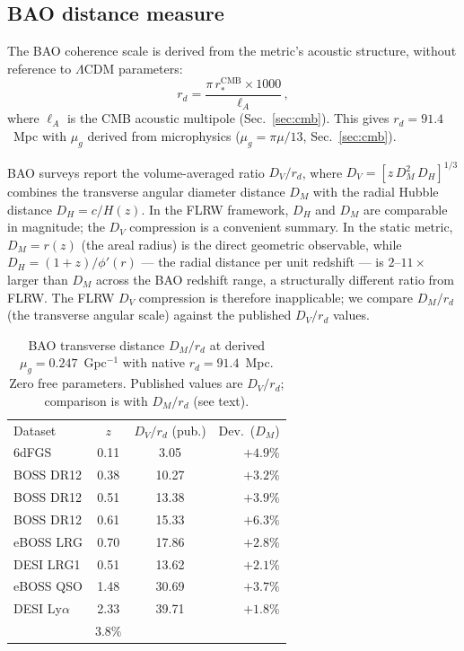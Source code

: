 \documentclass[aps,prd,twocolumn,superscriptaddress,nofootinbib,longbibliography]{revtex4-2}
\newcommand{\rstar}{r_{*}}
\newcommand{\mug}{\mu_g}
\begin{document}
\subsection{BAO distance measure}

The BAO coherence scale is derived from the metric's acoustic
structure, without reference to $\Lambda$CDM parameters:
\begin{equation}\label{eq:rd}
  r_d = \frac{\pi\,\rstar^{\mathrm{CMB}} \times 1000}{\ell_A}\,,
\end{equation}
where $\ell_A$ is the CMB acoustic multipole (Sec.~\ref{sec:cmb}).
This gives $r_d = 91.4$~Mpc with $\mug$ derived from microphysics
($\mug = \pi\mu/13$, Sec.~\ref{sec:cmb}).

BAO surveys report the volume-averaged ratio $D_V/r_d$, where
$D_V = [z\,D_M^2\,D_H]^{1/3}$ combines the transverse angular
diameter distance $D_M$ with the radial Hubble distance
$D_H = c/H(z)$.  In the FLRW framework, $D_H$ and $D_M$ are
comparable in magnitude; the $D_V$ compression is a convenient
summary.  In the static metric, $D_M = r(z)$ (the areal radius) is
the direct geometric observable, while
$D_H = (1+z)/\phi'(r)$ --- the radial distance per unit redshift ---
is $2$--$11\times$ larger than $D_M$ across the BAO redshift range,
a structurally different ratio from FLRW.  The FLRW $D_V$ compression
is therefore inapplicable; we compare $D_M/r_d$ (the transverse
angular scale) against the published $D_V/r_d$ values.

\begin{table}[t]
\caption{\label{tab:bao}%
BAO transverse distance $D_M/r_d$ at derived
$\mug = 0.247$~Gpc$^{-1}$ with native $r_d = 91.4$~Mpc.  Zero free
parameters.  Published values are $D_V/r_d$; comparison is with
$D_M/r_d$ (see text).}
\begin{ruledtabular}
\begin{tabular}{lccr}
Dataset & $z$ & $D_V/r_d$ (pub.) & Dev.\ ($D_M$) \\
\colrule
6dFGS  & 0.11 & 3.05  & $+4.9\%$ \\
BOSS DR12 & 0.38 & 10.27 & $+3.2\%$ \\
BOSS DR12 & 0.51 & 13.38 & $+3.9\%$ \\
BOSS DR12 & 0.61 & 15.33 & $+6.3\%$ \\
eBOSS LRG & 0.70 & 17.86 & $+2.8\%$ \\
DESI LRG1 & 0.51 & 13.62 & $+2.1\%$ \\
eBOSS QSO & 1.48 & 30.69 & $+3.7\%$ \\
DESI Ly$\alpha$ & 2.33 & 39.71 & $+1.8\%$ \\
\colrule
\multicolumn{3}{l}{RMS} & $3.8\%$ \\
\end{tabular}
\end{ruledtabular}
\end{table}
\end{document}
